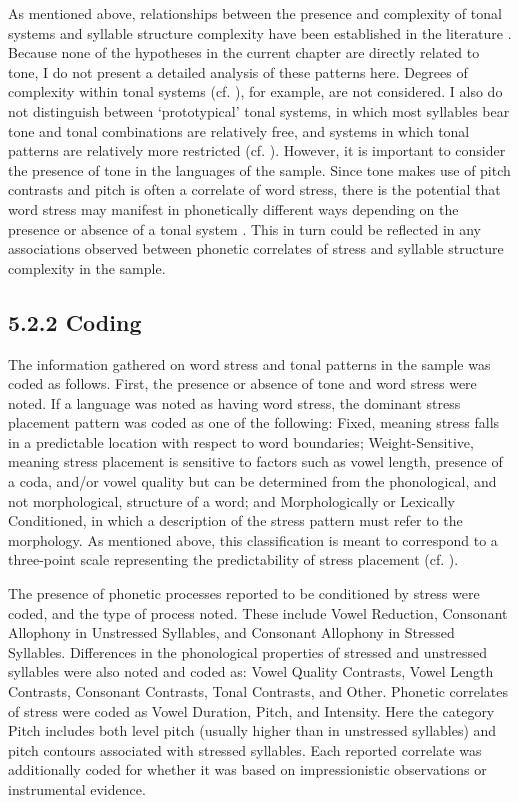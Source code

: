  As mentioned above, relationships between the presence and complexity of tonal systems and syllable structure complexity have been established in the literature \citep{Maddieson2013d}. Because none of the hypotheses in the current chapter are directly related to tone, I do not present a detailed analysis of these patterns here. Degrees of complexity within tonal systems (cf. \citealt{Maddieson2013d}), for example, are not considered. I also do not distinguish between ‘prototypical’ tonal systems, in which most syllables bear tone and tonal combinations are relatively free, and systems in which tonal patterns are relatively more restricted (cf. \citealt{Hyman2009}). However, it is important to consider the presence of tone in the languages of the sample. Since tone makes use of pitch contrasts and pitch is often a correlate of word stress, there is the potential that word stress may manifest in phonetically different ways depending on the presence or absence of a tonal system \citep{Gordon2011}. This in turn could be reflected in any associations observed between phonetic correlates of stress and syllable structure complexity in the sample. 

\subsection{5.2.2 Coding}

  The information gathered on word stress and tonal patterns in the sample was coded as follows. First, the presence or absence of tone and word stress were noted. If a language was noted as having word stress, the dominant stress placement pattern was coded as one of the following: Fixed, meaning stress falls in a predictable location with respect to word boundaries; Weight-Sensitive, meaning stress placement is sensitive to factors such as vowel length, presence of a coda, and/or vowel quality but can be determined from the phonological, and not morphological, structure of a word; and Morphologically or Lexically Conditioned, in which a description of the stress pattern must refer to the morphology. As mentioned above, this classification is meant to correspond to a three-point scale representing the predictability of stress placement (cf. \citealt{Schiering2007}). 

  The presence of phonetic processes reported to be conditioned by stress were coded, and the type of process noted. These include Vowel Reduction, Consonant Allophony in Unstressed Syllables, and Consonant Allophony in Stressed Syllables. Differences in the phonological properties of stressed and unstressed syllables were also noted and coded as: Vowel Quality Contrasts, Vowel Length Contrasts, Consonant Contrasts, Tonal Contrasts, and Other. Phonetic correlates of stress were coded as Vowel Duration, Pitch, and Intensity. Here the category Pitch includes both level pitch (usually higher than in unstressed syllables) and pitch contours associated with stressed syllables. Each reported correlate was additionally coded for whether it was based on impressionistic observations or instrumental evidence.

